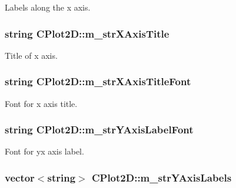 Labels along the x axis. \hypertarget{class_c_plot2_d_a642ae61e2dddca205305d70a21e0ab3f}{
\subsubsection[{m\-\_\-str\-X\-Axis\-Title}]{\setlength{\rightskip}{0pt plus 5cm}string C\-Plot2\-D\-::m\-\_\-str\-X\-Axis\-Title\hspace{0.3cm}{\ttfamily [protected]}}}\label{class_c_plot2_d_a642ae61e2dddca205305d70a21e0ab3f}
Title of x axis. \hypertarget{class_c_plot2_d_a7f79e280f598ac9630386dc8ad92e2e7}{
\subsubsection[{m\-\_\-str\-X\-Axis\-Title\-Font}]{\setlength{\rightskip}{0pt plus 5cm}string C\-Plot2\-D\-::m\-\_\-str\-X\-Axis\-Title\-Font\hspace{0.3cm}{\ttfamily [protected]}}}\label{class_c_plot2_d_a7f79e280f598ac9630386dc8ad92e2e7}
Font for x axis title. \hypertarget{class_c_plot2_d_ab402c414dc5bca0a88790388f0660f91}{
\subsubsection[{m\-\_\-str\-Y\-Axis\-Label\-Font}]{\setlength{\rightskip}{0pt plus 5cm}string C\-Plot2\-D\-::m\-\_\-str\-Y\-Axis\-Label\-Font\hspace{0.3cm}{\ttfamily [protected]}}}\label{class_c_plot2_d_ab402c414dc5bca0a88790388f0660f91}
Font for yx axis label. \hypertarget{class_c_plot2_d_ad4d97925d3a341f09652d22eadddb1e4}{
\subsubsection[{m\-\_\-str\-Y\-Axis\-Labels}]{\setlength{\rightskip}{0pt plus 5cm}vector$<$string$>$ C\-Plot2\-D\-::m\-\_\-str\-Y\-Axis\-Labels\hspace{0.3cm}{\ttfamily [protected]}}}\label{class_c_plot2_d_ad4d97925d3a341f09652d22eadddb1e4}

